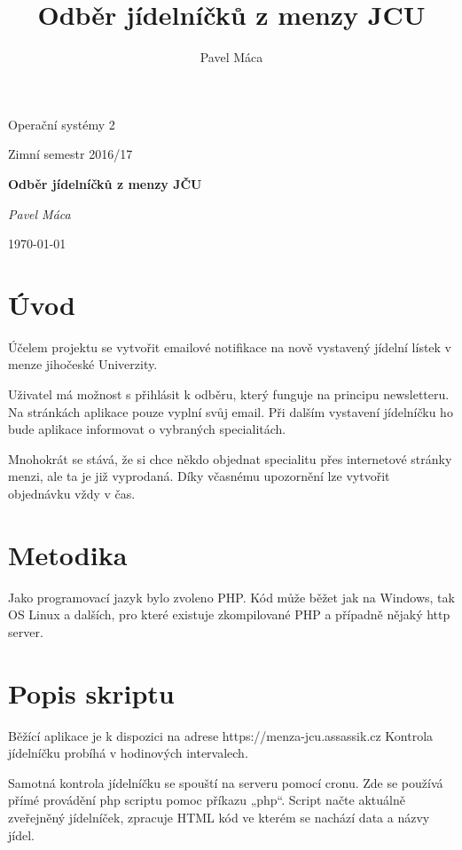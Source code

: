 \documentclass[a4]{article}
\title{Odběr jídelníčků z menzy JCU}
\author{Pavel Máca}
\begin{document}
\begin{titlepage}
	\centering
	{\Huge Operační systémy 2\par}
	\vspace{1cm}
	{\Large Zimní semestr 2016/17\par}
	\vspace{1.5cm}
	{\huge\bfseries Odběr jídelníčků z menzy JČU\par}
	\vspace{2cm}
	{\Large\itshape Pavel Máca\par}
	\vfill


	{\large \today\par}
\end{titlepage}

\pagebreak

\section{Úvod}
Účelem projektu se vytvořit emailové notifikace na nově vystavený jídelní lístek v menze jihočeské Univerzity.

Uživatel má možnost s přihlásit k odběru, který funguje na principu newsletteru. Na stránkách aplikace pouze vyplní svůj email. Při dalším vystavení jídelníčku ho bude aplikace informovat o vybraných specialitách.

Mnohokrát se stává, že si chce někdo objednat specialitu přes internetové stránky menzi, ale ta je již vyprodaná. Díky včasnému upozornění lze vytvořit objednávku vždy v čas.


\section{Metodika}
Jako programovací jazyk bylo zvoleno PHP. Kód může běžet jak na Windows, tak OS Linux  a dalších, pro které existuje zkompilované PHP a případně nějaký http server.

\section{Popis skriptu}
Běžící aplikace je k dispozici na adrese https://menza-jcu.assassik.cz 
Kontrola jídelníčku probíhá v hodinových intervalech.

Samotná kontrola jídelníčku se spouští na serveru pomocí cronu. Zde se používá přímé provádění php scriptu pomoc příkazu „php“. Script načte aktuálně zveřejněný jídelníček, zpracuje HTML kód ve kterém se nachází data a názvy jídel.
\end{document}
